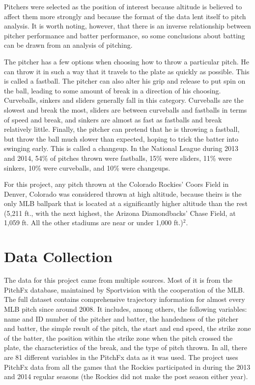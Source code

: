 \documentclass{article}
\begin{document}
Pitchers were selected as the position of interest because altitude is believed to affect them more strongly and because the format of the data lent itself to pitch analysis. It is worth noting, however, that there is an inverse relationship between pitcher performance and batter performance, so some conclusions about batting can be drawn from an analysis of pitching. 

The pitcher has a few options when choosing how to throw a particular pitch. He can throw it in such a way that it travels to the plate as quickly as possible. This is called a fastball. The pitcher can also alter his grip and release to put spin on the ball, leading to some amount of break in a direction of his choosing. Curveballs, sinkers and sliders generally fall in this category. Curveballs are the slowest and break the most, sliders are between curveballs and fastballs in terms of speed and break, and sinkers are almost as fast as fastballs and break relatively little. Finally, the pitcher can pretend that he is throwing a fastball, but throw the ball much slower than expected, hoping to trick the batter into swinging early. This is called a changeup. In the National League during 2013 and 2014, 54\% of pitches thrown were fastballs, 15\% were sliders, 11\% were sinkers, 10\% were curveballs, and 10\% were changeups.

For this project, any pitch thrown at the Colorado Rockies’ Coors Field in Denver, Colorado was considered thrown at high altitude, because theirs is the only MLB ballpark that is located at a significantly higher altitude than the rest (5,211 ft., with the next highest, the Arizona Diamondbacks’ Chase Field, at 1,059 ft. All the other stadiums are near or under 1,000 ft.)\(^{2}\). 

\section{Data Collection}

The data for this project came from multiple sources. Most of it is from the PitchFx database, maintained by Sportvision with the cooperation of the MLB. The full dataset contains comprehensive trajectory information for almost every MLB pitch since around 2008. It includes, among others, the following variables: name and ID number of the pitcher and batter, the handedness of the pitcher and batter, the simple result of the pitch, the start and end speed, the strike zone of the batter, the position within the strike zone when the pitch crossed the plate, the characteristics of the break, and the type of pitch thrown. In all, there are 81 different variables in the PitchFx data as it was used. The project uses PitchFx data from all the games that the Rockies participated in during the 2013 and 2014 regular seasons (the Rockies did not make the post season either year). 
\end{document}
